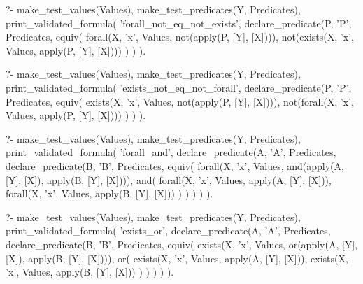 \begin{fact}
\begin{prolog}
?- 	make_test_values(Values),
	make_test_predicates(Y, Predicates),
	print_validated_formula(
		'forall_not_eq_not_exists',
		declare_predicate(P, 'P', Predicates,
			equiv(
				forall(X, 'x', Values, not(apply(P, [Y], [X]))),
				not(exists(X, 'x', Values, apply(P, [Y], [X])))
			)
		)
	).
\end{prolog}
\begin{prolog}
?- 	make_test_values(Values), make_test_predicates(Y, Predicates),
	print_validated_formula(
		'exists_not_eq_not_forall',
		declare_predicate(P, 'P', Predicates,
			equiv(
				exists(X, 'x', Values, not(apply(P, [Y], [X]))),
				not(forall(X, 'x', Values, apply(P, [Y], [X])))
			)
		)
	).
\end{prolog}
\begin{prolog}
?- 	make_test_values(Values),
	make_test_predicates(Y, Predicates),
	print_validated_formula(
		'forall_and',
		declare_predicate(A, 'A', Predicates,
			declare_predicate(B, 'B', Predicates,
				equiv(
					forall(X, 'x', Values, and(apply(A, [Y], [X]), apply(B, [Y], [X]))),
					and(
						forall(X, 'x', Values, apply(A, [Y], [X])),
						forall(X, 'x', Values, apply(B, [Y], [X]))
					)
				)
			)
		)
	).
\end{prolog}
\begin{prolog}
?- 	make_test_values(Values),
	make_test_predicates(Y, Predicates),
	print_validated_formula(
		'exists_or',
		declare_predicate(A, 'A', Predicates,
			declare_predicate(B, 'B', Predicates,
				equiv(
					exists(X, 'x', Values, or(apply(A, [Y], [X]), apply(B, [Y], [X]))),
					or(
						exists(X, 'x', Values, apply(A, [Y], [X])),
						exists(X, 'x', Values, apply(B, [Y], [X]))
					)
				)
			)
		)
	).
\end{prolog}
\end{fact}
